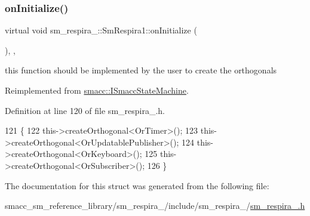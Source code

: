 \subsubsection{\texorpdfstring{on\+Initialize()}{onInitialize()}}
{\footnotesize\ttfamily virtual void sm\+\_\+respira\+\_\+::\+Sm\+Respira1\+::on\+Initialize (\begin{DoxyParamCaption}{ }\end{DoxyParamCaption})\hspace{0.3cm}{\ttfamily [inline]}, {\ttfamily [override]}, {\ttfamily [virtual]}}



this function should be implemented by the user to create the orthogonals 



Reimplemented from \hyperlink{classsmacc_1_1ISmaccStateMachine_ac2982c6c8283663e5e1e8a7c82f511ec}{smacc\+::\+I\+Smacc\+State\+Machine}.



Definition at line 120 of file sm\+\_\+respira\+\_.\+h.


\begin{DoxyCode}
121     \{
122         this->createOrthogonal<OrTimer>();
123         this->createOrthogonal<OrUpdatablePublisher>();
124         this->createOrthogonal<OrKeyboard>();
125         this->createOrthogonal<OrSubscriber>();
126     \}
\end{DoxyCode}


The documentation for this struct was generated from the following file\+:\begin{DoxyCompactItemize}
\item 
smacc\+\_\+sm\+\_\+reference\+\_\+library/sm\+\_\+respira\+\_/include/sm\+\_\+respira\+\_/\hyperlink{sm__respira__1_8h}{sm\+\_\+respira\+\_.\+h}\end{DoxyCompactItemize}
